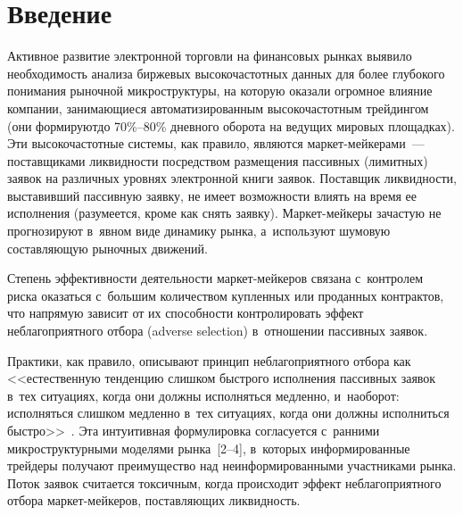 \vspace*{3pt}


\vspace*{6pt}



\thispagestyle{headings}

\begin{multicols}{2}

\label{st\stat}

\section{Введение}

Активное развитие электронной торговли на финансовых рынках выявило
необходимость анализа биржевых высокочастотных данных для \mbox{более}
глубокого понимания рыночной микроструктуры, на которую оказали
огромное влияние компании, занимающиеся автоматизированным
высо\-кочастотным трейдингом (они формируют\linebreak до 70\%--80\% дневного
оборота на ведущих мировых площадках). Эти высокочастотные системы,\linebreak
как правило, являются мар\-кет-мей\-ке\-ра\-ми~--- поставщиками ликвидности
посредством размещения пассивных (лимитных) заявок на различных
уровнях электронной книги заявок. Поставщик ликвидности, выставивший
пассивную заявку, не имеет возможности влиять на время ее исполнения
(разуме\-ет\-ся, кроме как снять заявку). Мар\-кет-мей\-ке\-ры
зачастую не прогнозируют в~явном виде динамику рынка, а~используют
шумовую составляющую рыночных движений.

Степень эффективности
деятельности мар\-кет-мей\-ке\-ров
связана с~контролем риска оказаться с~большим количеством
купленных или проданных контрактов, что напрямую
зависит от их способности контролировать эффект неблагоприятного
отбора (adverse selection) в~отношении пассивных заявок.

Практики, как правило, описывают принцип неблагоприятного отбора как
<<естественную тенденцию слишком быстрого исполнения пассивных
заявок в~тех ситуациях, когда они должны исполняться медленно,
и~наоборот: исполняться слишком медленно в~тех ситуациях, когда они
должны исполниться быст\-ро>>~\cite{Jeria2008}. Эта интуитивная
формулировка согласуется с~ранними микроструктурными моделями
рынка~[2--4], в~которых информированные
трейдеры получают преимущество над
неинформированными участниками рынка. Поток заявок считается
токсичным, когда происходит эффект неблагоприятного отбора
мар\-кет-мей\-ке\-ров, поставляющих ликвидность.


\end{multicols}
